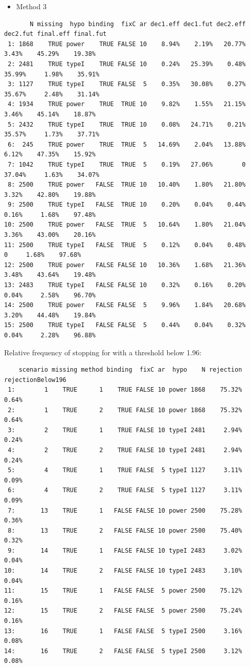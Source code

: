 \documentclass[12pt]{article}
\begin{document}
\begin{itemize}
\item Method 3
\end{itemize}
\begin{verbatim}
       N missing  hypo binding  fixC ar dec1.eff dec1.fut dec2.eff dec2.fut final.eff final.fut
 1: 1868    TRUE power    TRUE FALSE 10    8.94%    2.19%   20.77%    3.43%    45.29%    19.38%
 2: 2481    TRUE typeI    TRUE FALSE 10    0.24%   25.39%    0.48%   35.99%     1.98%    35.91%
 3: 1127    TRUE typeI    TRUE FALSE  5    0.35%   30.08%    0.27%   35.67%     2.48%    31.14%
 4: 1934    TRUE power    TRUE  TRUE 10    9.82%    1.55%   21.15%    3.46%    45.14%    18.87%
 5: 2432    TRUE typeI    TRUE  TRUE 10    0.08%   24.71%    0.21%   35.57%     1.73%    37.71%
 6:  245    TRUE power    TRUE  TRUE  5   14.69%    2.04%   13.88%    6.12%    47.35%    15.92%
 7: 1042    TRUE typeI    TRUE  TRUE  5    0.19%   27.06%        0   37.04%     1.63%    34.07%
 8: 2500    TRUE power   FALSE  TRUE 10   10.40%    1.80%   21.80%    3.32%    42.80%    19.88%
 9: 2500    TRUE typeI   FALSE  TRUE 10    0.20%    0.04%    0.44%    0.16%     1.68%    97.48%
10: 2500    TRUE power   FALSE  TRUE  5   10.64%    1.80%   21.04%    3.36%    43.00%    20.16%
11: 2500    TRUE typeI   FALSE  TRUE  5    0.12%    0.04%    0.48%        0     1.68%    97.68%
12: 2500    TRUE power   FALSE FALSE 10   10.36%    1.68%   21.36%    3.48%    43.64%    19.48%
13: 2483    TRUE typeI   FALSE FALSE 10    0.32%    0.16%    0.20%    0.04%     2.58%    96.70%
14: 2500    TRUE power   FALSE FALSE  5    9.96%    1.84%   20.68%    3.20%    44.48%    19.84%
15: 2500    TRUE typeI   FALSE FALSE  5    0.44%    0.04%    0.32%    0.04%     2.28%    96.88%
\end{verbatim}

Relative frequency of stopping for with a threshold below 1.96:
\begin{verbatim}
    scenario missing method binding  fixC ar  hypo    N rejection rejectionBelow196
 1:        1    TRUE      1    TRUE FALSE 10 power 1868    75.32%             0.64%
 2:        1    TRUE      2    TRUE FALSE 10 power 1868    75.32%             0.64%
 3:        2    TRUE      1    TRUE FALSE 10 typeI 2481     2.94%             0.24%
 4:        2    TRUE      2    TRUE FALSE 10 typeI 2481     2.94%             0.24%
 5:        4    TRUE      1    TRUE FALSE  5 typeI 1127     3.11%             0.09%
 6:        4    TRUE      2    TRUE FALSE  5 typeI 1127     3.11%             0.09%
 7:       13    TRUE      1   FALSE FALSE 10 power 2500    75.28%             0.36%
 8:       13    TRUE      2   FALSE FALSE 10 power 2500    75.40%             0.32%
 9:       14    TRUE      1   FALSE FALSE 10 typeI 2483     3.02%             0.04%
10:       14    TRUE      2   FALSE FALSE 10 typeI 2483     3.10%             0.04%
11:       15    TRUE      1   FALSE FALSE  5 power 2500    75.12%             0.16%
12:       15    TRUE      2   FALSE FALSE  5 power 2500    75.24%             0.16%
13:       16    TRUE      1   FALSE FALSE  5 typeI 2500     3.16%             0.08%
14:       16    TRUE      2   FALSE FALSE  5 typeI 2500     3.12%             0.08%
\end{verbatim}
\end{document}

